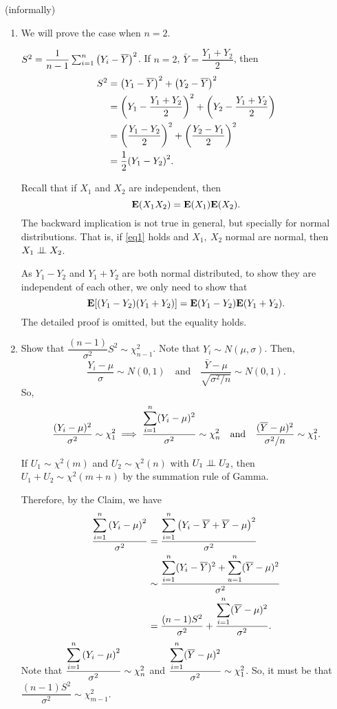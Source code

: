 \begin{prf}(informally)
	\begin{enumerate}
		\item We will prove the case when $n=2$. \par $S^2=\dfrac{1}{n-1}\sum_{i=1}^n\qty(Y_i-\overline{Y})^2$. If $n=2$, $\bar{Y}=\dfrac{Y_1+Y_2}{2}$, then \begin{align*}S^2&=\qty(Y_1-\overline{Y})^2+\qty(Y_2-\overline{Y})^2\\&=\qty(Y_1-\dfrac{Y_1+Y_2}{2})^2+\qty(Y_2-\dfrac{Y_1+Y_2}{2})\\&=\qty(\dfrac{Y_1-Y_2}{2})^2+\qty(\dfrac{Y_2-Y_1}{2})^2\\&=\dfrac{1}{2}\qty(Y_1-Y_2)^2.\end{align*}
		\begin{clm*}
			Recall that if $X_1$ and $X_2$ are independent, then \begin{equation}\label{eq1}\vb{E}(X_1X_2)=\vb{E}(X_1)\vb{E}(X_2).\end{equation} The backward implication is not true in general, but specially for normal distributions. That is, if  \eqref{eq1} holds and $X_1,\ X_2$ normal are normal, then $X_1\perp\!\!\!\perp X_2$.
		\end{clm*}
		As $Y_1-Y_2$ and $Y_1+Y_2$ are both normal distributed, to show they are independent of each other, we only need to show that \[\vb{E}\qty[(Y_1-Y_2)(Y_1+Y_2)]=\vb{E}(Y_1-Y_2)\vb{E}(Y_1+Y_2).\] The detailed proof is omitted, but the equality holds. 
		\item Show that $\dfrac{(n-1)}{\sigma^2}S^2\sim\chi_{n-1}^2$. Note that $Y_i\sim N(\mu,\sigma)$. Then, \[\dfrac{Y_i-\mu}{\sigma}\sim N(0,1)\quad\text{and}\quad\dfrac{\bar Y-\mu}{\sqrt{\sigma^2/n}}\sim N(0,1).\] So, \[\dfrac{(Y_i-\mu)^2}{\sigma^2}\sim\chi_1^2\implies\dfrac{\displaystyle\sum_{i=1}^n(Y_i-\mu)^2}{\sigma^2}\sim \chi_n^2\quad\text{and}\quad\dfrac{(\overline Y-\mu)^2}{\sigma^2/n}\sim\chi_1^2.\]
		\begin{clm*}
			If $U_1\sim\chi^2(m)$ and $U_2\sim\chi^2(n)$ with $U_1\perp\!\!\!\perp U_2$, then $U_1+U_2\sim\chi^2(m+n)$ by the summation rule of Gamma.	
		\end{clm*}
		Therefore, by the Claim, we have \begin{align*}\dfrac{\displaystyle\sum_{i=1}^n\qty(Y_i-\mu)^2}{\sigma^2}&=\dfrac{\displaystyle\sum_{i=1}^n\qty(Y_i-\overline Y+\overline Y-\mu)^2}{\sigma^2}\\&\sim\dfrac{\displaystyle\sum_{i=1}^n(Y_i-\overline Y)^2+\sum_{u=1}^n(\overline Y-\mu)^2}{\sigma^2}\\&=\dfrac{(n-1)S^2}{\sigma^2}+\dfrac{\displaystyle\sum_{i=1}^n(\overline Y-\mu)^2}{\sigma^2}.\end{align*} Note that $\dfrac{\displaystyle\sum_{i=1}^n\qty(Y_i-\mu)^2}{\sigma^2}\sim\chi_n^2$ and $\dfrac{\displaystyle\sum_{i=1}^n(\overline Y-\mu)^2}{\sigma^2}\sim \chi_1^2$. So, it must be that $\dfrac{(n-1)S^2}{\sigma^2}\sim\chi_{m-1}^2$.
	\end{enumerate}	
\end{prf}

